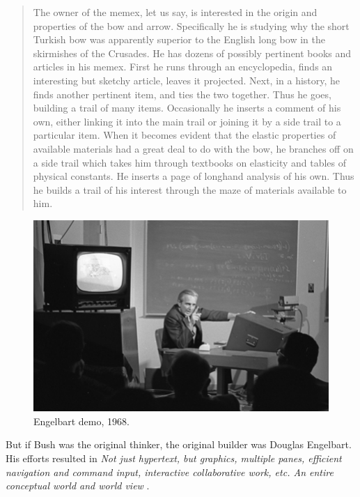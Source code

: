 \begin{quotation}
  The owner of the memex, let us say, is interested in the origin and
  properties of the bow and arrow. Specifically he is studying why the
  short Turkish bow was apparently superior to the English long bow in
  the skirmishes of the Crusades. He has dozens of possibly pertinent
  books and articles in his memex. First he runs through an
  encyclopedia, finds an interesting but sketchy article, leaves it
  projected. Next, in a history, he finds another pertinent item, and
  ties the two together. Thus he goes, building a trail of many
  items. Occasionally he inserts a comment of his own, either linking
  it into the main trail or joining it by a side trail to a particular
  item. When it becomes evident that the elastic properties of
  available materials had a great deal to do with the bow, he branches
  off on a side trail which takes him through textbooks on elasticity
  and tables of physical constants. He inserts a page of longhand
  analysis of his own. Thus he builds a trail of his interest through
  the maze of materials available to him. 
\end{quotation}


\begin{figure}
  \begin{center}
    \includegraphics[scale=0.4]{images/engelbart-demo.jpg}
  \end{center}
  \caption{Engelbart demo, 1968.}
\end{figure}

But if Bush was the original thinker, the original builder was Douglas
Engelbart. His efforts resulted in \emph{Not just hypertext, but
  graphics, multiple panes, efficient navigation and command input,
  interactive collaborative work, etc. An entire conceptual world and
  world view }\cite{smalltalk:kay_alan__early_history_smalltalk}
\cite{intelligence:engelbart__augmenting}.

